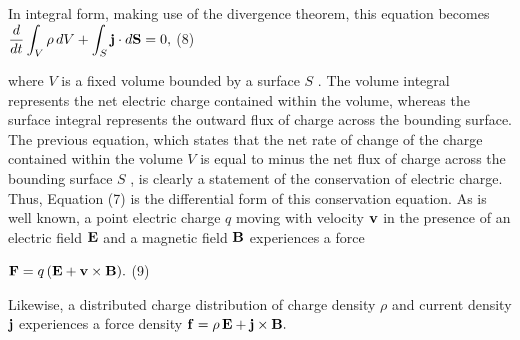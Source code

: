 \documentclass[12pt]{article}
\begin{document}
In integral form, making use of the divergence theorem, this equation becomes
$\displaystyle \frac{d}{dt}\int_V \rho\,dV +\int_S {\bf j}\cdot d{\bf S} = 0,$	(8)

where $ V$ is a fixed volume bounded by a surface $ S$ . The volume integral represents the net electric charge contained within the volume, whereas the surface integral represents the outward flux of charge across the bounding surface. The previous equation, which states that the net rate of change of the charge contained within the volume $ V$ is equal to minus the net flux of charge across the bounding surface $ S$ , is clearly a statement of the conservation of electric charge. Thus, Equation (7) is the differential form of this conservation equation.
As is well known, a point electric charge $ q$ moving with velocity $ {\bf v}$ in the presence of an electric field $ {\bf E}$ and a magnetic field $ {\bf B}$ experiences a force

$\displaystyle {\bf F} = q\,({\bf E} + {\bf v}\times {\bf B}).$	(9)

Likewise, a distributed charge distribution of charge density $ \rho$ and current density $ {\bf j}$ experiences a force density
 $\displaystyle {\bf f} = \rho\,{\bf E} + {\bf j}\times {\bf B}.$
\end{document}
